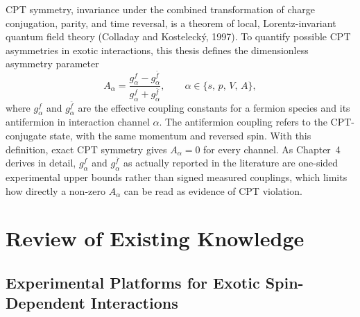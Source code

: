 CPT symmetry, invariance under the combined transformation of charge
conjugation, parity, and time reversal, is a theorem of local,
Lorentz-invariant quantum field theory (Colladay and Kostelecký, 1997). To
quantify possible CPT asymmetries in exotic interactions, this thesis
defines the dimensionless asymmetry parameter
\begin{equation}
  A_{\alpha}
  = \frac{g_{\alpha}^{f} - g_{\alpha}^{\bar{f}}}
         {g_{\alpha}^{f} + g_{\alpha}^{\bar{f}}},
  \qquad \alpha\in\{s,\,p,\,V,\,A\},
  \label{eq:asymmetry}
\end{equation}
where $g_{\alpha}^{f}$ and $g_{\alpha}^{\bar f}$ are the effective coupling
constants for a fermion species and its antifermion in interaction channel
$\alpha$. The antifermion coupling refers to the CPT-conjugate state, with
the same momentum and reversed spin. With this definition, exact CPT
symmetry gives $A_\alpha=0$ for every channel. As
Chapter~4 derives in detail, $g_\alpha^f$ and $g_\alpha^{\bar f}$ as
actually reported in the literature are one-sided experimental upper
bounds rather than signed measured couplings, which limits how directly a
non-zero $A_\alpha$ can be read as evidence of CPT violation.

\section{Review of Existing Knowledge}
\label{sec:review}

\subsection{Experimental Platforms for Exotic Spin-Dependent Interactions}

